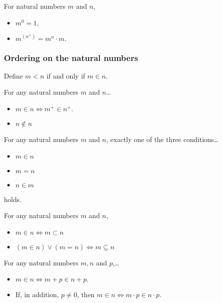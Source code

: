 \begin{proposition}
For natural numbers $m$ and $n$,
\begin{itemize}
  \item $m^0 = 1,$
  \item $m^{(n^+)} = m^n \cdot m.$
\end{itemize}
\end{proposition}

\subsubsection{Ordering on the natural numbers}\label{orderingonnaturalnumbers}
Define $m < n$ if and only if $m \in n.$

\begin{lemma}
For any natural numbers $m$ and $n$\dots
\begin{itemize}
  \item $m \in n \Leftrightarrow m^+ \in n^+.$
  \item $n \not\in n$
\end{itemize}
\end{lemma}

\begin{theorem}\label{trichotomy}
For any natural numbers $m$ and $n$, exactly one of the three conditions\dots
\begin{itemize}
  \item $m \in n$
  \item $m = n$
  \item $n \in m$
\end{itemize}
holds.
\end{theorem}

\begin{corollary}
For any natural numbers $m$ and $n$,
\begin{itemize}
  \item $m \in n \Leftrightarrow m \subset n$
  \item $(m \in n) \lor (m = n) \Leftrightarrow m \subseteq n$
\end{itemize}
\end{corollary}

\begin{proposition}
For any natural numbers $m,n$ and $p$,\dots
\begin{itemize}
  \item $m \in n \Leftrightarrow m + p \in n + p.$
  \item If, in addition, $p \neq 0$, then $m \in n \Leftrightarrow m \cdot p \in n \cdot p.$
\end{itemize}
\end{proposition}


